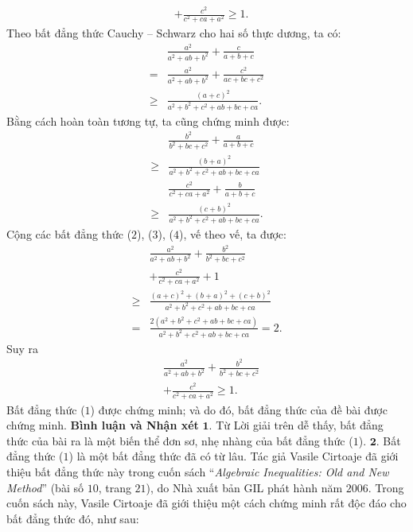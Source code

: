 \begin{multicols}{2}
\begin{align*}
		&+ \frac{{{c^2}}}{{{c^2} + ca + {a^2}}} \ge 1. \tag{$1$}
	\end{align*}
	Theo bất đẳng thức Cauchy -- Schwarz cho hai số thực dương, ta có:
	\begin{align*}
		&\frac{{{a^2}}}{{{a^2} + ab + {b^2}}} + \frac{c}{{a + b + c}} \\
		= &\frac{{{a^2}}}{{{a^2} + ab + {b^2}}} + \frac{{{c^2}}}{{ac + bc + {c^2}}} \\
		\ge &\frac{{{{\left( {a + c} \right)}^2}}}{{{a^2} + {b^2} + {c^2} + ab + bc + ca}}. \tag{$2$}
	\end{align*}
	Bằng cách hoàn toàn tương tự, ta cũng chứng minh được:
	\begin{align*}
		&\frac{{{b^2}}}{{{b^2} + bc + {c^2}}} + \frac{a}{{a + b + c}} \\
		\ge &\frac{{{{\left( {b + a} \right)}^2}}}{{{a^2} + {b^2} + {c^2} + ab + bc + ca}} \tag{$3$}\\
		&\frac{{{c^2}}}{{{c^2} + ca + {a^2}}} + \frac{b}{{a + b + c}} \\
		\ge &\frac{{{{\left( {c + b} \right)}^2}}}{{{a^2} + {b^2} + {c^2} + ab + bc + ca}}. \tag{$4$}
	\end{align*}
	Cộng các bất đẳng thức ($2$), ($3$), ($4$), vế theo vế, ta được:
	\begin{align*}
		&\frac{{{a^2}}}{{{a^2}+ ab + {b^2}}} + \frac{{{b^2}}}{{{b^2} + bc + {c^2}}} \\
		&+ \frac{{{c^2}}}{{{c^2} + ca + {a^2}}} + 1\\[+1ex]
		\ge &\frac{{{{\left( {a + c} \right)}^2} + {{\left( {b + a} \right)}^2} + {{\left( {c + b} \right)}^2}}}{{{a^2} + {b^2} + {c^2} + ab + bc + ca}}\\[+1ex]
		= &\frac{{2\left( {{a^2} + {b^2} + {c^2} + ab + bc + ca} \right)}}{{{a^2} + {b^2} + {c^2} + ab + bc + ca}} = 2.
	\end{align*}
	Suy ra
	\begin{align*}
		&\frac{{{a^2}}}{{{a^2} + ab + {b^2}}} + \frac{{{b^2}}}{{{b^2} + bc + {c^2}}} \\
		&+ \frac{{{c^2}}}{{{c^2} + ca + {a^2}}} \ge 1.
	\end{align*}
	Bất đẳng thức ($1$) được chứng minh; và do đó, bất đẳng thức của đề bài được chứng minh.
	\vskip 0.05cm
	\textbf{\color{thachthuctoanhoc}Bình luận và Nhận xét}
	\vskip 0.05cm
	$\pmb{1.}$ Từ Lời giải trên dễ thấy, bất đẳng thức của bài ra là một biến thể đơn sơ, nhẹ nhàng của bất đẳng thức ($1$).
	\vskip 0.05cm
	$\pmb{2.}$ Bất đẳng thức ($1$) là một bất đẳng thức đã có từ lâu. Tác giả Vasile Cirtoaje đã giới thiệu bất đẳng thức này trong cuốn sách “\textit{Algebraic Inequalities: Old and New Method}” (bài số $10$, trang $21$), do Nhà xuất bản GIL phát hành năm $2006$. Trong cuốn sách này, Vasile Cirtoaje đã giới thiệu một cách chứng minh rất độc đáo cho bất đẳng thức đó,  như sau:

\end{multicols}
